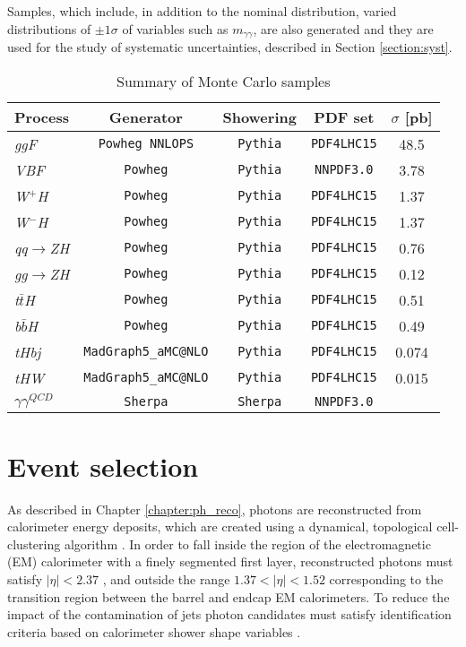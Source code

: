 \documentclass[a4paper, oneside, 11pt, openright]{book}
\begin{document}
			Samples, which include, in addition to the nominal distribution, varied distributions of $\pm1\sigma$ of variables such as $m_{\gamma\gamma}$, are also generated and they are used for the study of systematic uncertainties, described in Section \ref{section:syst}.
			
			\begin{table}[tbp]
				\centering
				\begin{tabular}{lcccc}
					\toprule[1.5pt]
					Process					& Generator						& Showering			& PDF set				& $\sigma$ [pb]		\\
					\midrule
					\textit{ggF}			& \texttt{Powheg NNLOPS}		& \texttt{Pythia}	& \texttt{PDF4LHC15}	& 48.5				\\
					\textit{VBF}			& \texttt{Powheg}				& \texttt{Pythia}	& \texttt{NNPDF3.0}		& 3.78				\\
					\textit{W$^+$H}			& \texttt{Powheg}				& \texttt{Pythia}	& \texttt{PDF4LHC15}	& 1.37				\\
					\textit{W$^-$H}			& \texttt{Powheg}				& \texttt{Pythia}	& \texttt{PDF4LHC15}	& 1.37				\\
					\textit{qq$\to$ZH}		& \texttt{Powheg}				& \texttt{Pythia}	& \texttt{PDF4LHC15}	& 0.76				\\
					\textit{gg$\to$ZH}		& \texttt{Powheg}				& \texttt{Pythia}	& \texttt{PDF4LHC15}	& 0.12				\\
					\textit{t$\bar{t}$H}	& \texttt{Powheg}				& \texttt{Pythia}	& \texttt{PDF4LHC15}	& 0.51				\\
					\textit{b$\bar{b}$H}	& \texttt{Powheg}				& \texttt{Pythia}	& \texttt{PDF4LHC15}	& 0.49				\\
					\textit{tHbj}			& \texttt{MadGraph5\_aMC@NLO}	& \texttt{Pythia}	& \texttt{PDF4LHC15}	& 0.074				\\
					\textit{tHW}			& \texttt{MadGraph5\_aMC@NLO}	& \texttt{Pythia}	& \texttt{PDF4LHC15}	& 0.015				\\
					\midrule
					\textit{$\gamma\gamma^{QCD}$} &  \texttt{Sherpa}		& \texttt{Sherpa}	& \texttt{NNPDF3.0}		&					\\
					\bottomrule[1.5pt]	
				\end{tabular}
				\caption{Summary of Monte Carlo samples}
			\end{table}	
 	
 		\section{Event selection}\label{section:selection}
 			As described in Chapter \ref{chapter:ph_reco}, photons are reconstructed from calorimeter energy deposits, which are created using a dynamical, topological cell-clustering algorithm \cite{topo_cluster}. In order to fall inside the region of the electromagnetic (EM) calorimeter with a finely segmented first layer, reconstructed photons must satisfy $|\eta| < 2.37$ , and outside the range $1.37 < |\eta| < 1.52$ corresponding to the transition region between the barrel and endcap EM calorimeters. To reduce the impact of the contamination of jets photon candidates must satisfy identification criteria based on calorimeter shower shape variables \cite{Aad_2019}.
 			
\end{document}
